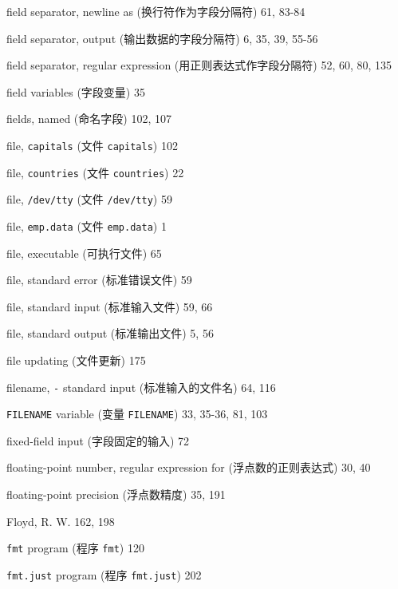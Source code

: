 \begin{multicols}{2}
\hangindent=2pc  field separator, newline as
(换行符作为字段分隔符) 61, 83-84

\hangindent=2pc  field separator, output (输出数据的字段分隔符)
6, 35, 39, 55-56

\hangindent=2pc  field separator, regular expression
(用正则表达式作字段分隔符) 52, 60, 80, 135

\hangindent=2pc  field variables (字段变量) 35

\hangindent=2pc  fields, named (命名字段) 102, 107

\hangindent=2pc  file, \verb'capitals' (文件 \verb'capitals') 102

\hangindent=2pc  file, \verb'countries' (文件 \verb'countries') 22

\hangindent=2pc  file, \verb'/dev/tty' (文件 \verb'/dev/tty') 59

\hangindent=2pc  file, \verb'emp.data' (文件 \verb'emp.data') 1

\hangindent=2pc  file, executable (可执行文件) 65

\hangindent=2pc  file, standard error (标准错误文件) 59

\hangindent=2pc  file, standard input (标准输入文件) 59, 66

\hangindent=2pc  file, standard output (标准输出文件) 5, 56

\hangindent=2pc  file updating (文件更新) 175

\hangindent=2pc  filename, \verb'-' standard input
(标准输入的文件名) 64, 116

\hangindent=2pc  \verb'FILENAME' variable (变量
\verb'FILENAME') 33, 35-36, 81, 103

\hangindent=2pc  fixed-field input (字段固定的输入) 72

\hangindent=2pc  floating-point number, regular expression for
(浮点数的正则表达式) 30, 40

\hangindent=2pc  floating-point precision (浮点数精度) 35, 191

\hangindent=2pc  Floyd, R. W. 162, 198

\hangindent=2pc  \verb'fmt' program (程序 \verb'fmt') 120

\hangindent=2pc  \verb'fmt.just' program (程序 \verb'fmt.just') 202


\end{multicols}
